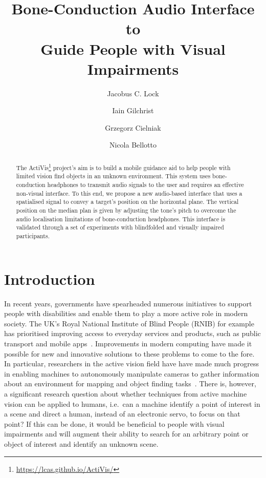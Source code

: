 \documentclass{llncs}
\begin{document}
\title{Bone-Conduction Audio Interface to\\Guide People with Visual Impairments}

\author{Jacobus C. Lock \and 
Iain Gilchrist \and
Grzegorz Cielniak \and
Nicola Bellotto}



\maketitle
\setcounter{footnote}{0}

\begin{abstract}
  The ActiVis\footnote{\url{https://lcas.github.io/ActiVis/}} project's aim is to build a mobile guidance aid to help people with limited vision find objects in an unknown environment.
  This system uses bone-conduction headphones to transmit audio signals to the user and requires an effective non-visual interface.
  To this end, we propose a new audio-based interface that uses a spatialised signal to convey a target's position on the horizontal plane. 
  The vertical position on the median plan is given by adjusting the tone's pitch to overcome the audio localisation limitations of bone-conduction headphones. 
  This interface is validated through a set of experiments with blindfolded and visually impaired participants. 
\end{abstract} 

\section{Introduction}

In recent years, governments have spearheaded numerous initiatives to support people with disabilities and enable them to play a more active role in modern society.
The UK's Royal National Institute of Blind People (RNIB) for example has prioritised improving access to everyday services and products, such as public transport and mobile apps~\cite{rnib2016uk}.
Improvements in modern computing have made it possible for new and innovative solutions to these problems to come to the fore.
In particular, researchers in the active vision field have have made much progress in enabling machines to autonomously manipulate cameras to gather information about an environment for mapping and object finding tasks~\cite{bajcsy2018revisiting,lock2019active}.
There is, however, a significant research question about whether techniques from active machine vision can be applied to humans, i.e.\ can a machine identify a point of interest in a scene and direct a human, instead of an electronic servo, to focus on that point?
If this can be done, it would be beneficial to people with visual impairments and will augment their ability to search for an arbitrary point or object of interest and identify an unknown scene. 
\end{document}
